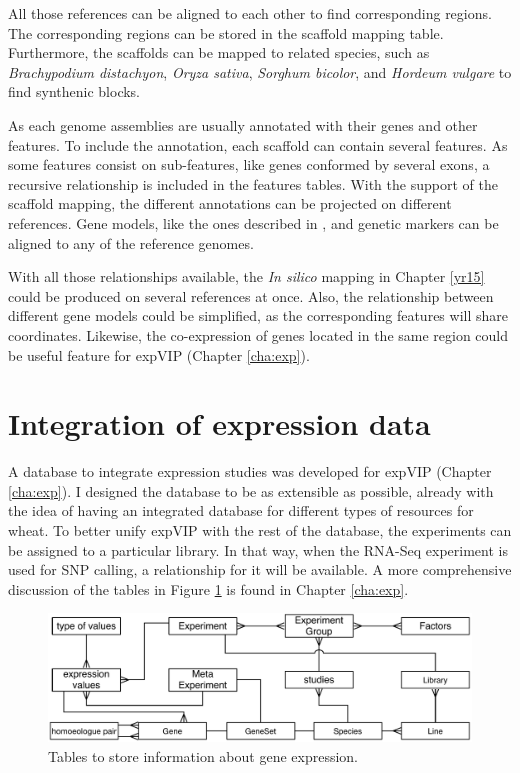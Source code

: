 All those references can be aligned to each other to find corresponding regions. 
The corresponding regions can be stored in the scaffold mapping table. 
Furthermore, the scaffolds can be mapped to related species, such as \textit{Brachypodium distachyon}, \textit{Oryza sativa}, \textit{Sorghum bicolor}, and \textit{Hordeum vulgare} to find synthenic blocks. 

As each genome assemblies are usually annotated with their genes and other features. 
To include the annotation, each scaffold can contain several features. 
As some features consist on sub-features, like genes conformed by several exons, a recursive relationship is included in the features tables. 
With the support of the scaffold mapping, the different annotations can be projected on different references. 
Gene models, like the ones described in \citep{Krasileva2013}, and  genetic markers can be aligned to any of the reference genomes.

With all those relationships available, the \textit{In silico} mapping in Chapter \ref{yr15} could be produced on several references at once. 
Also, the relationship between different gene models could be simplified, as the corresponding features will share coordinates.
Likewise, the co-expression of genes located in the same region could be useful feature for expVIP (Chapter \ref{cha:exp}). 

\section{Integration of expression data}

A database to integrate expression studies was developed for expVIP (Chapter \ref{cha:exp}). 
I designed the database to be as extensible as possible, already with the idea of having an integrated database for different types of resources for wheat. 
To better unify expVIP with the rest of the database, the experiments can be assigned to a particular library. 
In that way, when the RNA-Seq experiment is used for SNP calling, a relationship for it will be available. 
A more comprehensive discussion of the tables in Figure \ref{fig:discussion:expressionTables} is found in Chapter \ref{cha:exp}. 

\begin{figure}[h]
\includegraphics[width=1\textwidth]{Conclusions/Figures/ExpressionTables.pdf}
\caption{Tables to store information about gene expression.}
\label{fig:discussion:expressionTables}
\end{figure}

